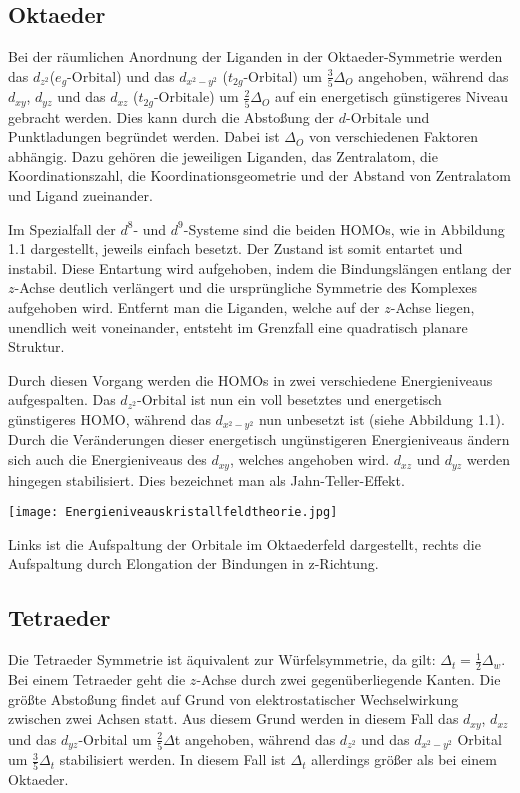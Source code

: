 \subsection{Oktaeder}
Bei der räumlichen Anordnung der Liganden in der Oktaeder-Symmetrie werden das $d_{z^2}$($e_g$-Orbital) und das $d_{x^2-y^2}$ ($t_{2g}$-Orbital) um $\frac{3}{5}\Delta_{O}$  angehoben, während das $d_{xy}$, $d_{yz}$ und das $d_{xz}$ ($t_{2g}$-Orbitale) um $\frac{2}{5}\Delta_{O}$ auf ein energetisch günstigeres Niveau gebracht werden. 
Dies kann durch die Abstoßung der $d$-Orbitale und Punktladungen begründet werden.
Dabei ist $\Delta_{O}$ von verschiedenen Faktoren abhängig. Dazu gehören die jeweiligen Liganden, das Zentralatom, die Koordinationszahl, die Koordinationsgeometrie und der Abstand von Zentralatom und Ligand zueinander.

Im Spezialfall der $ d^{8} $- und $ d^{9} $-Systeme sind die beiden HOMOs, wie in Abbildung 1.1 dargestellt, jeweils  einfach besetzt.
Der Zustand ist somit entartet und instabil. Diese Entartung wird aufgehoben, indem die Bindungslängen entlang der $z$-Achse deutlich verlängert und die ursprüngliche Symmetrie des Komplexes aufgehoben wird.
Entfernt man die Liganden, welche auf der $z$-Achse liegen, unendlich weit voneinander, entsteht im Grenzfall eine quadratisch planare Struktur.

Durch diesen Vorgang werden die HOMOs in zwei verschiedene Energieniveaus aufgespalten. Das $d_{z^2}$-Orbital ist nun ein voll besetztes und energetisch günstigeres HOMO, während das $d_{x^2-y^2}$ nun unbesetzt ist (siehe Abbildung 1.1). Durch die Veränderungen dieser energetisch ungünstigeren Energieniveaus ändern sich auch die Energieniveaus des $d_{xy}$, welches angehoben wird. $d_{xz}$ und $d_{yz}$ werden hingegen stabilisiert.
Dies bezeichnet man als Jahn-Teller-Effekt.

\begin{dsafigure}
\centering
\texttt{[image: Energieniveauskristallfeldtheorie.jpg]}
\caption{Links ist die Aufspaltung der Orbitale im Oktaederfeld dargestellt, rechts die Aufspaltung durch Elongation der Bindungen in z-Richtung.}
\label{dsafigure:beispiel}
\end{dsafigure}

\subsection{Tetraeder}
Die Tetraeder Symmetrie ist äquivalent zur Würfelsymmetrie, da gilt: $\Delta_{t}=\frac{1}{2}\Delta_{w}$.
\cite{Koordinationsverbindung}
Bei einem Tetraeder geht die $z$-Achse durch zwei gegenüberliegende Kanten. Die größte Abstoßung findet auf Grund von elektrostatischer Wechselwirkung zwischen zwei Achsen statt. Aus diesem Grund werden in diesem Fall das $d_{xy}$, $d_{xz}$ und das $d_{yz}$-Orbital um $\frac{2}{5}\Delta$t angehoben, während das $d_{z^2}$ und das $d_{x^2 - y^2}$ Orbital um $\frac{3}{5} \Delta_t$ stabilisiert werden. In diesem Fall ist $\Delta _{t}$ allerdings größer als bei einem Oktaeder.
